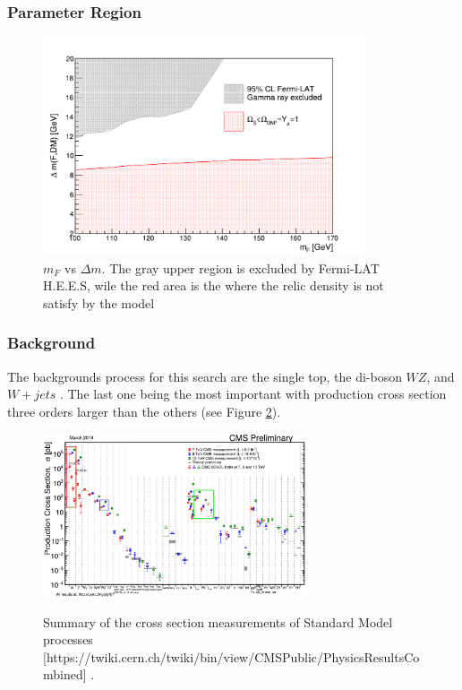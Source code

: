 \documentclass{beamer}
\begin{document}
\begin{frame}
\frametitle{Parameter Region}

\begin{figure}[!tbp]
	\centering
	\includegraphics[width=0.85\textwidth]{pictures/LimitPlotsTesis}%
	\caption{{\scriptsize $m_F$ vs $\Delta m$. The gray upper region is excluded by Fermi-LAT H.E.E.S, wile the red area is the where the relic density is not satisfy by the model}}
	\label{fig7}
\end{figure}


\end{frame}
\begin{frame}
\frametitle{Background}
\begin{justify}
The backgrounds process for this search are the single top, the di-boson $WZ$, and $W+jets$ . The last one being the most important with production cross section three orders larger than the others (see Figure \ref{XSSummary}).

\end{justify}

\begin{figure}[!tbp]
	\centering
	\includegraphics[width=0.7\textwidth]{pictures/CrossSectionSMProcesses}\label{fig8}
	\caption{{\scriptsize Summary of the cross section measurements of Standard Model processes [{\tiny https://twiki.cern.ch/twiki/bin/view/CMSPublic/PhysicsResultsCombined}]	}.}
	\label{XSSummary}
\end{figure}

\end{frame}
\end{document}
